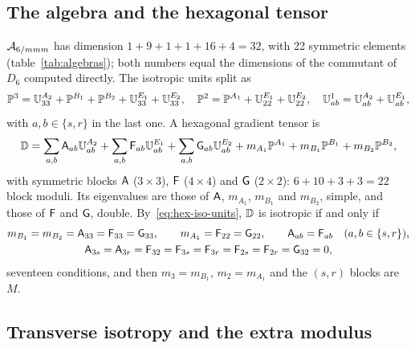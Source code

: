 \subsection{The algebra and the hexagonal tensor}\label{sec:hex-algebra}

$\mathcal{A}_{6/mmm}$ has dimension $1+9+1+1+16+4=32$, with 22 symmetric elements
(table~\ref{tab:algebras}); both numbers equal the dimensions of the commutant of $D_6$
computed directly. The
isotropic units split as
\begin{equation}
\mathbb{P}^{3}=\mathbb{U}^{A_2}_{33}+\mathbb{P}^{B_1}+\mathbb{P}^{B_2}+\mathbb{U}^{E_1}_{33}+\mathbb{U}^{E_2}_{33},\quad
\mathbb{P}^{2}=\mathbb{P}^{A_1}+\mathbb{U}^{E_1}_{22}+\mathbb{U}^{E_2}_{22},\quad
\mathbb{U}^{1}_{ab}=\mathbb{U}^{A_2}_{ab}+\mathbb{U}^{E_1}_{ab},\label{eq:hex-iso-units}
\end{equation}
with $a,b\in\{s,r\}$ in the last one. A hexagonal gradient tensor is
\begin{equation}
\mathbb{D}=\sum_{a,b}\mathsf{A}_{ab}\mathbb{U}^{A_2}_{ab}+\sum_{a,b}\mathsf{F}_{ab}\mathbb{U}^{E_1}_{ab}
+\sum_{a,b}\mathsf{G}_{ab}\mathbb{U}^{E_2}_{ab}+m_{A_1}\mathbb{P}^{A_1}+m_{B_1}\mathbb{P}^{B_1}+m_{B_2}\mathbb{P}^{B_2},
\label{eq:hex-tensor}
\end{equation}
with symmetric blocks $\mathsf{A}$ ($3\times3$), $\mathsf{F}$ ($4\times4$) and $\mathsf{G}$ ($2\times2$):
$6+10+3+3=22$ block moduli. Its eigenvalues are those of $\mathsf{A}$, $m_{A_1}$, $m_{B_1}$
and $m_{B_2}$, simple, and those of $\mathsf{F}$ and $\mathsf{G}$, double. By~\eqref{eq:hex-iso-units},
$\mathbb{D}$ is isotropic if and only if
\begin{equation}
\begin{gathered}
m_{B_1}=m_{B_2}=\mathsf{A}_{33}=\mathsf{F}_{33}=\mathsf{G}_{33},\qquad m_{A_1}=\mathsf{F}_{22}=\mathsf{G}_{22},
\qquad \mathsf{A}_{ab}=\mathsf{F}_{ab}\quad(a,b\in\{s,r\}),\\
\mathsf{A}_{3s}=\mathsf{A}_{3r}=\mathsf{F}_{32}=\mathsf{F}_{3s}=\mathsf{F}_{3r}=\mathsf{F}_{2s}=\mathsf{F}_{2r}=\mathsf{G}_{32}=0,
\end{gathered}\label{eq:hex-isotropy}
\end{equation}
seventeen conditions, and then $m_3=m_{B_1}$, $m_2=m_{A_1}$ and the $(s,r)$ blocks are
$M$.

\subsection{Transverse isotropy and the extra modulus}\label{sec:hex-extra}


